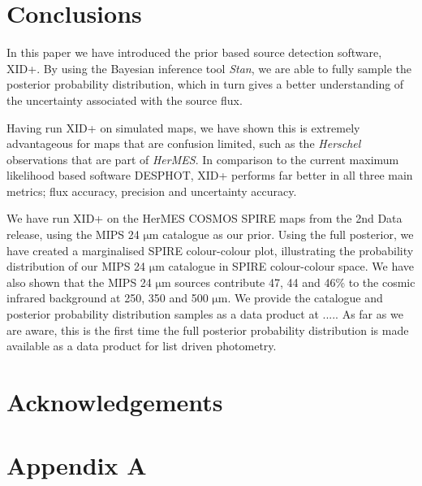 \documentclass[useAMS,usenatbib]{mnras}
\begin{document}
\section{Conclusions}\label{sec:conc}
In this paper we have introduced the prior based source detection software, \textsc{XID+}. By using the Bayesian inference tool \emph{Stan}, we are able to fully sample the posterior probability distribution, which in turn gives a better understanding of the uncertainty associated with the source flux. 

Having run \textsc{XID+} on simulated maps, we have shown this is extremely advantageous for maps that are confusion limited, such as the \emph{Herschel} observations that are part of \emph{HerMES}. In comparison to the current maximum likelihood based software \textsc{DESPHOT}, XID+ performs far better in all three main metrics; flux accuracy, precision and uncertainty accuracy.

We have run \textsc{XID+} on the HerMES COSMOS SPIRE maps from the 2nd Data release, using the MIPS 24 $\mathrm{\mu m}$ catalogue \citep{LeFLoch:2009} as our prior. Using the full posterior, we have created a marginalised SPIRE colour-colour plot, illustrating the probability distribution of our MIPS 24 $\mathrm{\mu m}$ catalogue in SPIRE colour-colour space. We have also shown that the MIPS 24 $\mathrm{\mu m}$ sources contribute 47, 44 and 46\%  to the cosmic infrared background at 250, 350 and 500 $\mathrm{\mu m}$. We provide the catalogue and posterior probability distribution samples as a data product at ..... As far as we are aware, this is the first time the full posterior probability distribution is made available as a data product for list driven photometry.
 

\section*{Acknowledgements}%
%
%
%

\appendix
\section*{Appendix A}\label{Stan_model}
\onecolumn

%
%
%
%
%
%
%
\end{document}
